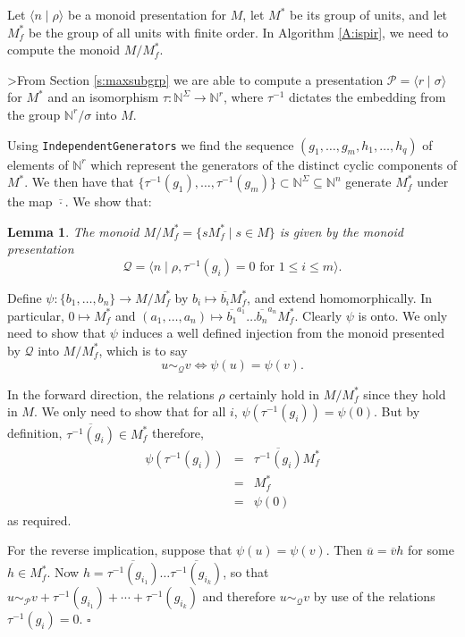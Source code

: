 \documentclass[12pt]{article}
\newtheorem{lemma}{Lemma}
\newenvironment{proof}{{\it Proof.\/}}{$\square$\\}
\begin{document}
Let $\langle n \mid \rho \rangle$ be a monoid presentation for $M$,
let $M^*$ be its group of units, and let $M^*_f$ be the group of all units
with finite order. In Algorithm \ref{A:ispir}, we need to compute the
monoid $M/M^*_f$.

>From Section \ref{s:maxsubgrp} we are able to compute a presentation
$\mathcal{P} = \langle r \mid \sigma \rangle $ for $M^*$ and an isomorphism 
$\tau: \mathbb{N}^\Sigma \rightarrow \mathbb{N}^r$, where 
$\tau^{-1}$ dictates the embedding from the group $\mathbb{N}^r/\sigma$ 
into $M$.

Using {\tt IndependentGenerators}  we find the sequence
$(g_1, \ldots, g_m, h_1, \ldots, h_q)$ of elements of 
$\mathbb{N}^r$ which represent the generators of the distinct
cyclic components of $M^*$. We then have that 
$\{\tau^{-1}(g_1), \ldots, \tau^{-1}(g_m)\} \subset \mathbb{N}^\Sigma \subseteq
\mathbb{N}^n$ generate $M^*_f$ under the map $\overline{\cdot}$.
We show that:
\begin{lemma}\label{t:mgpres}
The monoid $M/M^*_f = \{sM^*_f \mid s \in M\}$ 
is given by the monoid presentation
$$\mathcal{Q} = \langle n \mid 
\rho, \tau^{-1}(g_i) = 0 \mbox{ for $1 \leq i \leq m$}\rangle.$$
\end{lemma}

\begin{proof}
Define $\psi : \{b_1, \ldots, b_n\}  \rightarrow M/M^*_f$ by
$b_i \mapsto \overline{b_i} M^*_f$, and extend homomorphically. 
In particular, $0 \mapsto M^*_f$ and
$(a_1, \ldots, a_n) \mapsto 
\overline{b_1}^{a_1} \ldots \overline{b_n}^{a_n} M^*_f$.
Clearly $\psi$ is onto.
We only need to show that $\psi$ induces a well defined injection from
the monoid presented by $\mathcal{Q}$ into $M/M^*_f$, which is to say
$$u \sim_\mathcal{Q} v \Leftrightarrow \psi(u) = \psi(v).$$

In the forward direction, the relations $\rho$ certainly hold in 
$M/M^*_f$ since they hold in $M$. We only need to show that 
for all $i$, $\psi(\tau^{-1}(g_i)) = \psi(0)$. But by definition,
$\overline{\tau^{-1}(g_i)} \in M^*_f$ therefore, 
\begin{eqnarray*}
\psi(\tau^{-1}(g_i))& = & \overline{\tau^{-1}(g_i)}M^*_f \\
		& = & M^*_f \\
		& = & \psi(0)
\end{eqnarray*}
as required.

For the reverse implication, suppose 
that $\psi(u) = \psi(v)$. Then
$\overline{u} = \overline{v} h$ for some $h \in M^*_f$.
Now $h = \overline{\tau^{-1}(g_{i_1})} \ldots \overline{\tau^{-1}(g_{i_k})}$,
so that 
$u \sim_\mathcal{P} v + \tau^{-1}(g_{i_1}) + \cdots + \tau^{-1}(g_{i_k})$
and therefore $u \sim_\mathcal{Q} v$ by use of the relations
$\tau^{-1}(g_{i}) = 0$.
\end{proof}
\end{document}
